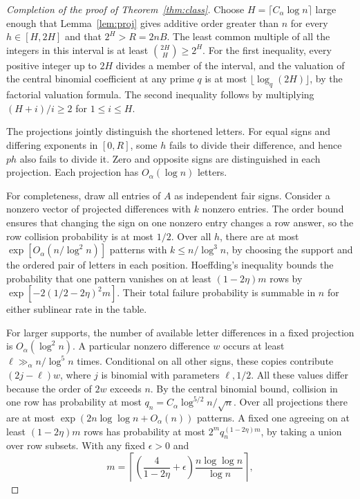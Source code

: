 \documentclass[11pt,letterpaper]{article}
\numberwithin{equation}{section}
\begin{document}
\begin{proof}[Completion of the proof of Theorem~\ref{thm:class}]

Choose $H=\lceil C_\alpha\log n\rceil$ large enough that Lemma~\ref{lem:proj} gives additive
order greater than $n$ for every $h\in[H,2H]$ and that $2^H>R=2nB$. The least common multiple
of all the integers in this interval is at least $\binom{2H}{H}\ge2^H$. For the first
inequality, every positive integer up to $2H$ divides a member of the interval, and the
valuation of the central binomial coefficient at any prime $q$ is at most
$\lfloor\log_q(2H)\rfloor$, by the factorial valuation formula. The second inequality follows
by multiplying $(H+i)/i\ge2$ for $1\le i\le H$.

The projections jointly distinguish the shortened letters. For equal signs and differing
exponents in $[0,R]$, some $h$ fails to divide their difference, and hence $ph$ also fails to
divide it. Zero and opposite signs are distinguished in each projection. Each projection has
$O_\alpha(\log n)$ letters.

For completeness, draw all entries of $A$ as independent fair signs. Consider a nonzero vector
of projected differences with $k$ nonzero entries. The order bound ensures that changing the
sign on one nonzero entry changes a row answer, so the row collision probability is at most
$1/2$. Over all $h$, there are at most $\exp[O_\alpha(n/\log^2 n)]$ patterns with $k\le
n/\log^3 n$, by choosing the support and the ordered pair of letters in each position.
Hoeffding's inequality bounds the probability that one pattern vanishes on at least
$(1-2\eta)m$ rows by $\exp[-2(1/2-2\eta)^2m]$. Their total failure probability is summable in
$n$ for either sublinear rate in the table.

For larger supports, the number of available letter differences in a fixed projection is
$O_\alpha(\log^2 n)$. A particular nonzero difference $w$ occurs at least $\ell\gg_\alpha
n/\log^5 n$ times. Conditional on all other signs, these copies contribute $(2j-\ell)w$, where
$j$ is binomial with parameters $\ell,1/2$. All these values differ because the order of $2w$
exceeds $n$. By the central binomial bound, collision in one row has probability at most
$q_n=C_\alpha\log^{5/2}n/\sqrt n$. Over all projections there are at most $\exp(2n\log\log
n+O_\alpha(n))$ patterns. A fixed one agreeing on at least $(1-2\eta)m$ rows has probability
at most $2^m q_n^{(1-2\eta)m}$, by taking a union over row subsets. With any fixed
$\epsilon>0$ and
\[
m=\left\lceil\left(\frac4{1-2\eta}+\epsilon\right)\frac{n\log\log n}{\log n}\right\rceil ,
\]


\end{proof}
\end{document}
